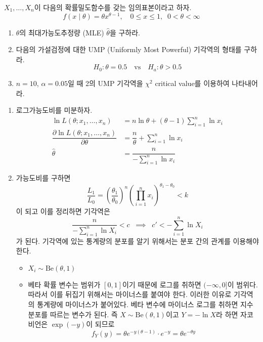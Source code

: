 \documentclass[answers]{exam}
\begin{document}
\begin{questions}
\begin{solution}
   \end{solution}
   \question
   $X_{1},\ldots,X_{n}$이 다음의 확률밀도함수를 갖는 임의표본이라고 하자.
   $$
    f\left(x\;|\;\theta\right)=\theta x^{\theta-1},\quad 0\leq x\leq 1, \;\; 0<\theta<\infty
   $$
   \begin{enumerate}
    \item $\theta$의 최대가능도추정량 (MLE) $\hat{\theta}$을 구하라.
    \item 다음의 가설검정에 대한 UMP (Uniformly Most Powerful) 기각역의 형태를 구하라.
    $$
      H_{0}: \theta=0.5\quad \text{vs} \quad H_{a}:\theta>0.5
    $$
    \item $n=10$, $\alpha=0.05$일 때 2의 UMP 기각역을 $\chi^{2}$ critical value를 이용하여 나타내어라.
   \end{enumerate}
   \begin{solution}
    \begin{enumerate}
      \item 로그가능도비를 미분하자.
      \begin{align}
        \ln L\left(\theta;x_{1},\ldots,x_{n}\right) &= n\ln \theta + \left(\theta-1\right)\sum_{i=1}^{n}\ln x_{i}\\
        \dfrac{\partial\ln L\left(\theta;x_{1},\ldots,x_{n}\right)}{\partial \theta} &= \dfrac{n}{\theta}+\sum_{i=1}^{n}\ln x_{i}\\
        \widehat{\theta} &= \dfrac{n}{-\sum_{i=1}^{n}\ln x_{i}}
      \end{align}
      \item 가능도비를 구하면
      $$
        \dfrac{L_{1}}{L_{0}} = \left(\dfrac{\theta_{1}}{\theta_{0}}\right)^{n}\left(\prod_{i=1}^{n}x_{i}\right)^{\theta_{1}-\theta_{0}} <k
      $$
      이 되고 이를 정리하면 기각역은
      $$
        \dfrac{n}{-\sum_{i=1}^{n}\ln X_{i}} < c \;\;\implies \;\; c'<-\sum_{i=1}^{n}\ln X_{i}
      $$
      가 된다. 기각역에 있는 통계량의 분포를 알기 위해서는 분포 간의 관계를 이용해야 한다.
      \begin{itemize}
        \item $X_{i}\sim \mathrm{Be}\left(\theta,1\right)$
        \item 베타 확률 변수는 범위가 $[0,1]$이기 때문에 로그를 취하면 $(-\infty,0]$이 범위다. 따라서 이를 뒤집기 위해서는 마이너스를 붙여야 한다. 이러한 이유로 기각역의 통계량에 마이너스가 붙어있다. 베타 변수에 마이너스 로그를 취하면 지수 분포를 따르는 변수가 된다. 즉 $X \sim \mathrm{Be}\left(\theta,1\right)$이고 $Y=-\ln X$라 하면 자코비언은 $\exp\left(-y\right)$이 되므로
        $$
          f_{Y}\left(y\right) = \theta e^{-y\left(\theta-1\right)}\cdot e^{-y} = \theta e^{-\theta y}
$$
\end{itemize}
\end{enumerate}
\end{solution}
\end{questions}
\end{document}
